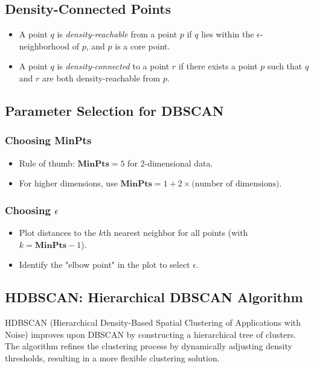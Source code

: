 \documentclass[12pt,a4paper]{article}
\begin{document}
\subsection{Density-Connected Points}
\begin{itemize}
    \item A point $q$ is \textit{density-reachable} from a point $p$ if $q$ lies within the $\epsilon$-neighborhood of $p$, and $p$ is a core point.
    \item A point $q$ is \textit{density-connected} to a point $r$ if there exists a point $p$ such that $q$ and $r$ are both density-reachable from $p$.
\end{itemize}

\subsection{Parameter Selection for DBSCAN}
\subsubsection{Choosing \textbf{MinPts}}
\begin{itemize}
    \item Rule of thumb: $\textbf{MinPts} = 5$ for 2-dimensional data.
    \item For higher dimensions, use $\textbf{MinPts} = 1 + 2 \times \text{(number of dimensions)}$.
\end{itemize}

\subsubsection{Choosing $\epsilon$}
\begin{itemize}
    \item Plot distances to the $k$th nearest neighbor for all points (with $k = \textbf{MinPts} - 1$).
    \item Identify the "elbow point" in the plot to select $\epsilon$.
\end{itemize}

\subsection{HDBSCAN: Hierarchical DBSCAN Algorithm}

HDBSCAN (Hierarchical Density-Based Spatial Clustering of Applications with Noise) improves upon DBSCAN by constructing a hierarchical tree of clusters. The algorithm refines the clustering process by dynamically adjusting density thresholds, resulting in a more flexible clustering solution.
\end{document}
